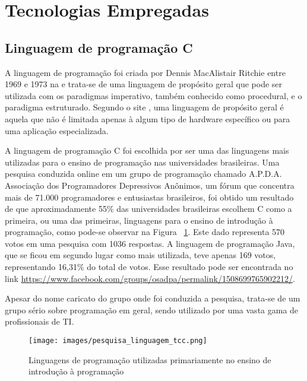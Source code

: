 \documentclass[12pt, %
openright,
oneside, %
a4paper,    %
brazil]{facom-ufu-abntex2}
\begin{document}
\section{Tecnologias Empregadas}

\subsection{Linguagem de programação C}
A linguagem de programação  foi criada por Dennis MacAlistair Ritchie entre 1969 e 1973 na  e trata-se de uma linguagem de propósito geral que pode ser utilizada com os paradigmas imperativo, também conhecido como procedural, e o paradigma estruturado. Segundo o site , uma linguagem de propósito geral é aquela que não é limitada apenas à algum tipo de hardware específico ou para uma aplicação especializada.

A linguagem de programação C foi escolhida por ser uma das linguagens mais utilizadas para o ensino de programação nas universidades brasileiras. Uma pesquisa conduzida online em um grupo de programação chamado A.P.D.A. Associação dos Programadores Depressivos Anônimos, um fórum que concentra mais de 71.000 programadores e entusiastas brasileiros, foi obtido um resultado de que aproximadamente 55\% das universidades brasileiras escolhem C como a primeira, ou uma das primeiras, linguagens para o ensino de introdução à programação, como pode-se observar na Figura ~\ref{fig:pesquisa_linguagem_tcc}. Este dado representa 570 votos em uma pesquisa com 1036 respostas. A linguagem de programação Java, que se ficou em segundo lugar como mais utilizada, teve apenas 169 votos, representando 16,31\% do total de votos. Esse resultado pode ser encontrada no link \url{https://www.facebook.com/groups/osadpa/permalink/1508699765902212/}.

Apesar do nome caricato do grupo onde foi conduzida a pesquisa, trata-se de um grupo sério sobre programação em geral, sendo utilizado por uma vasta gama de profissionais de TI.

\pagebreak
\begin{figure}[htbp]
  \centering
  \texttt{[image: images/pesquisa\_linguagem\_tcc.png]}
  \caption{Linguagens de programação utilizadas primariamente no ensino de introdução à programação}
  \label{fig:pesquisa_linguagem_tcc}
\end{figure}
\end{document}
